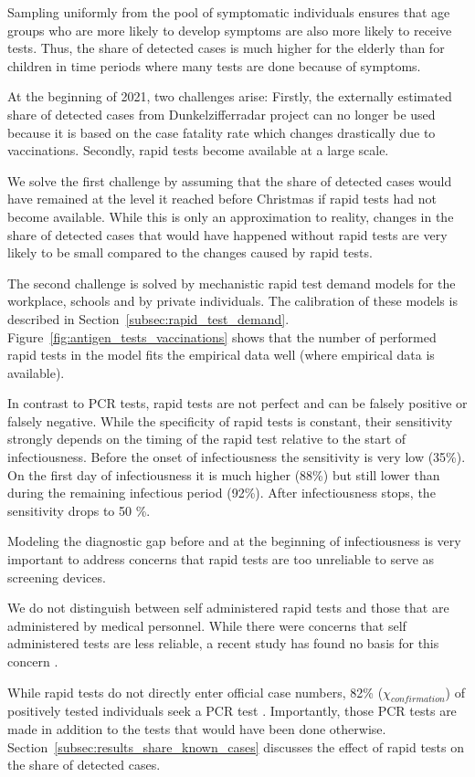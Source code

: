 Sampling uniformly from the pool of symptomatic individuals ensures that age groups who
are more likely to develop symptoms are also more likely to receive tests. Thus, the
share of detected cases is much higher for the elderly than for children in time periods
where many tests are done because of symptoms.

At the beginning of 2021, two challenges arise: Firstly, the externally estimated share
of detected cases from Dunkelzifferradar project \citep{Dunkelzifferradar2020} can no
longer be used because it is based on the case fatality rate which changes drastically
due to vaccinations. Secondly, rapid tests become available at a large scale.

We solve the first challenge by assuming that the share of detected cases would have
remained at the level it reached before Christmas if rapid tests had not become
available. While this is only an approximation to reality, changes in the share of
detected cases that would have happened without rapid tests are very likely to be small
compared to the changes caused by rapid tests.

The second challenge is solved by mechanistic rapid test demand models for the
workplace, schools and by private individuals. The calibration of these models is
described in Section~\ref{subsec:rapid_test_demand}.
Figure~\ref{fig:antigen_tests_vaccinations} shows that the number of performed rapid
tests in the model fits the empirical data well (where empirical data is available).

In contrast to PCR tests, rapid tests are not perfect and can be falsely positive or
falsely negative. While the specificity of rapid tests is constant, their sensitivity
strongly depends on the timing of the rapid test relative to the start of infectiousness.
Before the onset of infectiousness the sensitivity is very low (35\%). On the first day
of infectiousness it is much higher (88\%) but still lower than during the remaining
infectious period (92\%). After infectiousness stops, the sensitivity drops to 50 \%.

Modeling the diagnostic gap before and at the beginning of infectiousness is very
important to address concerns that rapid tests are too unreliable to serve as screening
devices.

We do not distinguish between self administered rapid tests and those that are
administered by medical personnel. While there were concerns that self administered
tests are less reliable, a recent study has found no basis for this
concern \citep{Lindner2020}.

While rapid tests do not directly enter official case numbers, 82\%
($\chi_{confirmation}$) of positively tested individuals seek a PCR test
\citep{Betsch2021}. Importantly, those PCR tests are made in addition to the tests that
would have been done otherwise. Section~\ref{subsec:results_share_known_cases} discusses
the effect of rapid tests on the share of detected cases.

